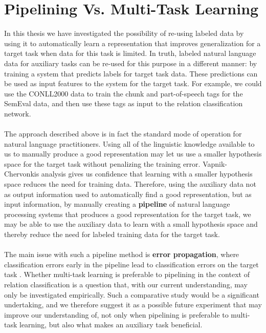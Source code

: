 \section{Pipelining Vs. Multi-Task Learning}
In this thesis we have investigated the possibility of re-using labeled data by using it to automatically learn a representation that improves generalization for a target task when data for this task is limited. In truth, labeled natural language data for auxiliary tasks can be re-used for this purpose in a different manner: by training a system that predicts labels for target task data. These predictions can be used as input features to the system for the target task. For example, we could use the CONLL2000 data to train the chunk and part-of-speech tags for the SemEval data, and then use these tags as input to the relation classification network.
\\\\
The approach described above is in fact the standard mode of operation for natural language practitioners. Using all of the linguistic knowledge available to us to manually produce a good representation may let us use a smaller hypothesis space for the target task without penalizing the training error. Vapnik-Chervonkis analysis gives us confidence that learning with a smaller hypothesis space reduces the need for training data. Therefore, using the auxiliary data not as output information used to automatically find a good representation, but as input information, by manually creating a \textbf{pipeline} of natural language processing systems that produces a good representation for the target task, we may be able to use the auxiliary data to learn with a small hypothesis space and thereby reduce the need for labeled training data for the target task.
\\\\
The main issue with such a pipeline method is \textbf{error propagation}, where classification errors early in the pipeline lead to classification errors on the target task \citep{collobert2011}. Whether multi-task learning is preferable to pipelining in the context of relation classification is a question that, with our current understanding, may only be investigated empirically. Such a comparative study would be a significant undertaking, and we therefore suggest it as a possible future experiment that may improve our understanding of, not only when pipelining is preferable to multi-task learning, but also what makes an auxiliary task beneficial.
